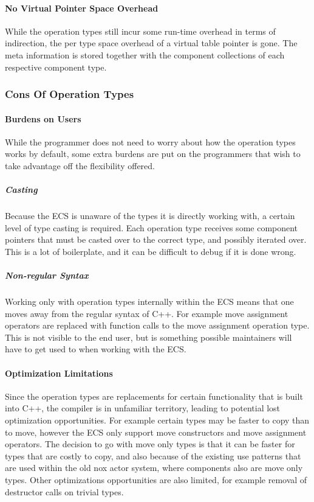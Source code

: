 \paragraph{No Virtual Pointer Space Overhead}
While the operation types still incur some run-time overhead in terms of indirection,
the per type space overhead of a virtual table pointer is gone.
The meta information is stored together with the component collections of each respective component type.

\subsubsection{Cons Of Operation Types}
\paragraph{Burdens on Users}
While the programmer does not need to worry about how the operation types works by default,
some extra burdens are put on the programmers that wish to take advantage off the flexibility offered.

\subparagraph{Casting}
Because the ECS is unaware of the types it is directly working with, a certain level of type casting is required.
Each operation type receives some component pointers that must be casted over to the correct type,
and possibly iterated over. This is a lot of boilerplate, and it can be difficult to debug if it is done wrong.

\subparagraph{Non-regular Syntax}
Working only with operation types internally within the ECS means that one moves away from the regular syntax of C++.
For example move assignment operators are replaced with function calls to the move assignment operation type.
This is not visible to the end user, but is something possible maintainers will have to get used to when working with the ECS.

\paragraph{Optimization Limitations}
Since the operation types are replacements for certain functionality that is built into C++, the compiler is in
unfamiliar territory, leading to potential lost optimization opportunities.
For example certain types may be faster to copy than to move, however the ECS only support move constructors
and move assignment operators.
The decision to go with move only types is that it can be faster for types that are costly to copy,
and also because of the existing use patterns that are used within the old nox actor system, where components
also are move only types.
Other optimizations opportunities are also limited, for example removal of destructor calls on trivial types.

